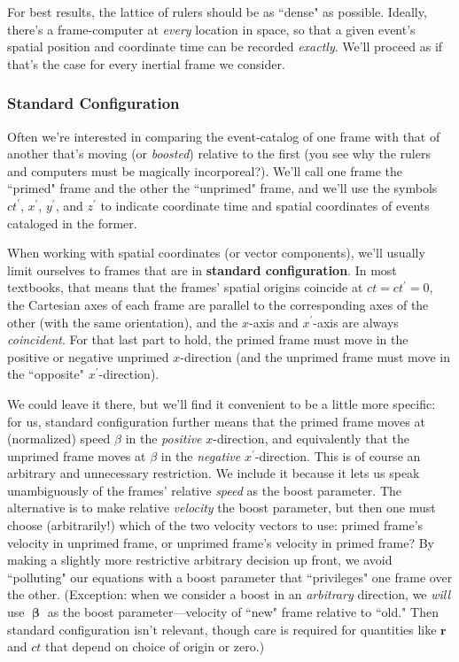 \documentclass[12pt]{article}
\renewcommand{\vv}[1]{\mathbf{#1}}
\newcommand{\vvbeta}{\bm{\upbeta}}
\begin{document}
For best results, the lattice of rulers should be as ``dense" as possible. Ideally, there's a frame-computer at \emph{every} location in space, so that a given event's spatial position and coordinate time can be recorded \emph{exactly}. We'll proceed as if that's the case for every inertial frame we consider.


\subsubsection{Standard Configuration}\label{sssec:standardconfig}

Often we're interested in comparing the event-catalog of one frame with that of another that's moving (or \emph{boosted}) relative to the first (you see why the rulers and computers must be magically incorporeal?). We'll call one frame the ``primed" frame and the other the ``unprimed" frame, and we'll use the symbols $ct^{\prime}$, $x^{\prime}$, $y^{\prime}$, and $z^{\prime}$ to indicate coordinate time and spatial coordinates of events cataloged in the former.

When working with spatial coordinates (or vector components), we'll usually limit ourselves to frames that are in \textbf{standard configuration}. In most textbooks, that means that the frames' spatial origins coincide at $ct = ct^{\prime} = 0$, the Cartesian axes of each frame are parallel to the corresponding axes of the other (with the same orientation), and the $x$-axis and $x^{\prime}$-axis are always \emph{coincident}. For that last part to hold, the primed frame must move in the positive or negative unprimed $x$-direction (and the unprimed frame must move in the ``opposite" $x^{\prime}$-direction).

We could leave it there, but we'll find it convenient to be a little more specific: for us, standard configuration further means that the primed frame moves at (normalized) speed $\beta$ in the \emph{positive} $x$-direction, and equivalently that the unprimed frame moves at $\beta$ in the \emph{negative} $x^{\prime}$-direction. This is of course an arbitrary and unnecessary restriction. We include it because it lets us speak unambiguously of the frames' relative \emph{speed} as the boost parameter. The alternative is to make relative \emph{velocity} the boost parameter, but then one must choose (arbitrarily!) which of the two velocity vectors to use: primed frame's velocity in unprimed frame, or unprimed frame's velocity in primed frame? By making a slightly more restrictive arbitrary decision up front, we avoid ``polluting" our equations with a boost parameter that ``privileges" one frame over the other. (Exception: when we consider a boost in an \emph{arbitrary} direction, we \emph{will} use $\vvbeta$ as the boost parameter---velocity of ``new" frame relative to ``old." Then standard configuration isn't relevant, though care is required for quantities like $\vv r$ and $ct$ that depend on choice of origin or zero.)
\end{document}
